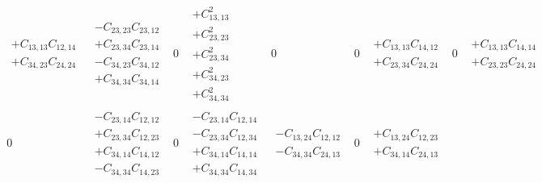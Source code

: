 \documentclass[pra,nofootinbib]{revtex4-1}
\newcommand{\C}[2]{C_{{#1},{#2}}}
\begin{document}
\begin{eqnarray}
\begin{array}{cccccccccccccccc}
\begin{array}{c}
     + \C{13}{13}\C{12}{14} \\
     + \C{34}{23}\C{24}{24} 
     \end{array} &
     \begin{array}{c}
     - \C{23}{23}\C{23}{12} \\
     + \C{23}{34}\C{23}{14} \\
     - \C{34}{23}\C{34}{12} \\
     + \C{34}{34}\C{34}{14}
     \end{array} &
     0 &
     \begin{array}{c}
     + \C{13}{13}^2 \\
     + \C{23}{23}^2 \\
     + \C{23}{34}^2 \\
     + \C{34}{23}^2 \\
     + \C{34}{34}^2
     \end{array} &
     0 &
     0 &
     \begin{array}{c}
     + \C{13}{13}\C{14}{12} \\
     + \C{23}{34}\C{24}{24}
     \end{array} &
     0 &
     \begin{array}{c}
     + \C{13}{13}\C{14}{14} \\
     + \C{23}{23}\C{24}{24}
     \end{array} \\
     0 &
     \begin{array}{c}
     - \C{23}{14}\C{12}{12} \\
     + \C{23}{34}\C{12}{23} \\
     + \C{34}{14}\C{14}{12} \\
     - \C{34}{34}\C{14}{23} 
     \end{array} &
     0 &
     \begin{array}{c}
     - \C{23}{14}\C{12}{14} \\
     - \C{23}{34}\C{12}{34} \\
     + \C{34}{14}\C{14}{14} \\
     + \C{34}{34}\C{14}{34} 
     \end{array} &
     \begin{array}{c}
     - \C{13}{24}\C{12}{12} \\
     - \C{34}{34}\C{24}{13} 
     \end{array} &
     0 &
     \begin{array}{c}
     + \C{13}{24}\C{12}{23} \\
     + \C{34}{14}\C{24}{13} 
     \end{array} &

\end{array}
\end{eqnarray}
\end{document}
